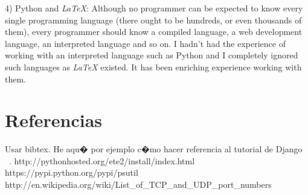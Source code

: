 \documentclass[10pt]{article}
\begin{document}
4) Python and \textit{LaTeX}: Although no programmer can be expected to know every single programming language (there ought to be hundreds, or even thousands of them), every programmer should know a compiled language, a web development language, an interpreted language and so on. I hadn't had the experience of working with an interpreted language such as Python and I completely ignored such languages as \textit{LaTeX} existed. It has been enriching experience working with them.\\

\section{Referencias}
 Usar bibtex. He aqu� por ejemplo c�mo hacer referencia al tutorial de Django ~\cite{DjangoTut}.
http://pythonhosted.org/ete2/install/index.html
https://pypi.python.org/pypi/psutil
http://en.wikipedia.org/wiki/List\_of\_TCP\_and\_UDP\_port\_numbers
{}

\end{document}
